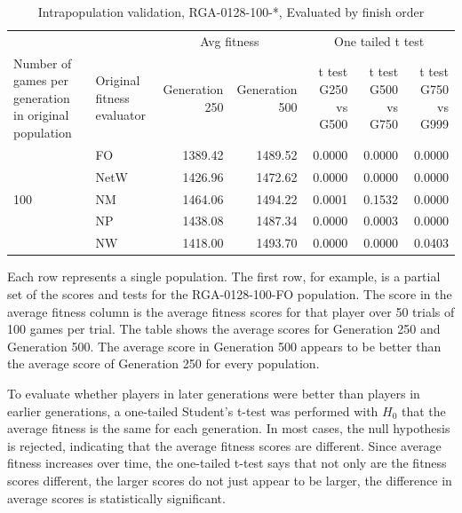 \begin{table}[htbp]
  \centering
  \caption{Intrapopulation validation, RGA-0128-100-*, Evaluated by finish
  order}
    \begin{tabularx}{\linewidth}{|p{1in}|p{1in}|r|r|r|r|r|}
    \cline{3-7}
    \multicolumn{1}{l}{} &  & \multicolumn{2}{c|}{Avg fitness} & \multicolumn{3}{c|}{One tailed t test} \\
    \cline{1-7}
    Number of games per generation in original population
    & Original fitness evaluator
    & \multicolumn{1}{p{0.7in}|}{Generation 250}
    & \multicolumn{1}{p{0.7in}|}{Generation 500}
    & \multicolumn{1}{X|}{t test G250 vs G500}
    & \multicolumn{1}{X|}{t test G500 vs G750}
    & \multicolumn{1}{X|}{t test G750 vs G999} \\
    \cline{1-7}
      \multirow{5}{*}{100}
      & FO & 1389.42 & 1489.52 & 0.0000 & 0.0000 & 0.0000 \\
      \cline{2-7}
      & NetW & 1426.96 & 1472.62 & 0.0000 & 0.0000 & 0.0000 \\
      \cline{2-7}
      & NM & 1464.06 & 1494.22 & 0.0001 & 0.1532 & 0.0000 \\
      \cline{2-7}
      & NP & 1438.08 & 1487.34 & 0.0000 & 0.0003 & 0.0000 \\
      \cline{2-7}
      & NW & 1418.00 & 1493.70 & 0.0000 & 0.0000 & 0.0403 \\
      \cline{1-7}
    \end{tabularx}%
  \label{tab:validationRGA0128}%
\end{table}%

Each row represents a single population. The first row, for example, is a
partial set of the scores and tests for the RGA-0128-100-FO population. The
score in the average fitness column is the average fitness scores for that
player over 50 trials of 100 games per trial. The table shows the average scores
for Generation 250 and Generation 500. The average score in Generation 500
appears to be better than the average score of Generation 250 for every
population.

To evaluate whether players in later generations were better than players in
earlier generations, a one-tailed Student's t-test was performed with $H_{0}$
that the average fitness is the same for each generation. In most cases, the
null hypothesis is rejected, indicating that the average fitness scores are
different. Since average fitness increases over time, the one-tailed t-test says
that not only are the fitness scores different, the larger scores do not just
appear to be larger, the difference in average scores is statistically
significant.

